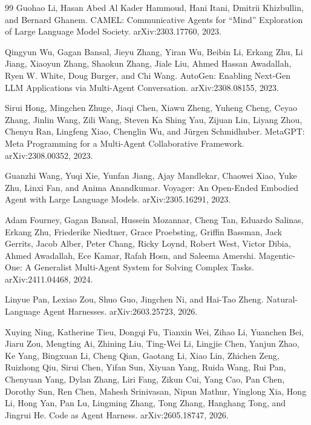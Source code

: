 \documentclass{article}
\begin{document}
\begin{thebibliography}{99}
Guohao Li, Hasan Abed Al Kader Hammoud, Hani Itani, Dmitrii Khizbullin, and Bernard Ghanem.
\newblock CAMEL: Communicative Agents for ``Mind'' Exploration of Large Language Model Society.
\newblock arXiv:2303.17760, 2023.

Qingyun Wu, Gagan Bansal, Jieyu Zhang, Yiran Wu, Beibin Li, Erkang Zhu, Li Jiang, Xiaoyun Zhang, Shaokun Zhang, Jiale Liu, Ahmed Hassan Awadallah, Ryen W. White, Doug Burger, and Chi Wang.
\newblock AutoGen: Enabling Next-Gen LLM Applications via Multi-Agent Conversation.
\newblock arXiv:2308.08155, 2023.

Sirui Hong, Mingchen Zhuge, Jiaqi Chen, Xiawu Zheng, Yuheng Cheng, Ceyao Zhang, Jinlin Wang, Zili Wang, Steven Ka Shing Yau, Zijuan Lin, Liyang Zhou, Chenyu Ran, Lingfeng Xiao, Chenglin Wu, and J\"urgen Schmidhuber.
\newblock MetaGPT: Meta Programming for a Multi-Agent Collaborative Framework.
\newblock arXiv:2308.00352, 2023.

Guanzhi Wang, Yuqi Xie, Yunfan Jiang, Ajay Mandlekar, Chaowei Xiao, Yuke Zhu, Linxi Fan, and Anima Anandkumar.
\newblock Voyager: An Open-Ended Embodied Agent with Large Language Models.
\newblock arXiv:2305.16291, 2023.

Adam Fourney, Gagan Bansal, Hussein Mozannar, Cheng Tan, Eduardo Salinas, Erkang Zhu, Friederike Niedtner, Grace Proebsting, Griffin Bassman, Jack Gerrits, Jacob Alber, Peter Chang, Ricky Loynd, Robert West, Victor Dibia, Ahmed Awadallah, Ece Kamar, Rafah Hosn, and Saleema Amershi.
\newblock Magentic-One: A Generalist Multi-Agent System for Solving Complex Tasks.
\newblock arXiv:2411.04468, 2024.

Linyue Pan, Lexiao Zou, Shuo Guo, Jingchen Ni, and Hai-Tao Zheng.
\newblock Natural-Language Agent Harnesses.
\newblock arXiv:2603.25723, 2026.

Xuying Ning, Katherine Tieu, Dongqi Fu, Tianxin Wei, Zihao Li, Yuanchen Bei, Jiaru Zou, Mengting Ai, Zhining Liu, Ting-Wei Li, Lingjie Chen, Yanjun Zhao, Ke Yang, Bingxuan Li, Cheng Qian, Gaotang Li, Xiao Lin, Zhichen Zeng, Ruizhong Qiu, Sirui Chen, Yifan Sun, Xiyuan Yang, Ruida Wang, Rui Pan, Chenyuan Yang, Dylan Zhang, Liri Fang, Zikun Cui, Yang Cao, Pan Chen, Dorothy Sun, Ren Chen, Mahesh Srinivasan, Nipun Mathur, Yinglong Xia, Hong Li, Hong Yan, Pan Lu, Lingming Zhang, Tong Zhang, Hanghang Tong, and Jingrui He.
\newblock Code as Agent Harness.
\newblock arXiv:2605.18747, 2026.


\end{thebibliography}
\end{document}
